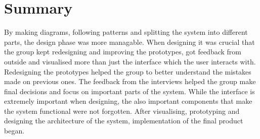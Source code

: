 \chapter{Summary}

By making diagrams, following patterns and splitting the system into different parts, the design phase was more managable.
When designing it was crucial that the group kept redesigning and improving the prototypes, got feedback from outside and visualised more than just the interface which the user interacts with.
Redesigning the prototypes helped the group to better understand the mistakes made on previous ones.
The feedback from the interviews helped the group make final decisions and focus on important parts of the system.
While the interface is extremely important when designing, the also important components that make the system functional were not forgotten.
After visualising, prototyping and designing the architecture of the system, implementation of the final product began.